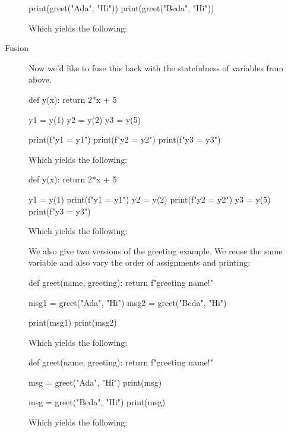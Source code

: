 \begin{description}
\begin{minipage}[t]{0.45\columnwidth}
\begin{pyblock}[funcG2]
print(greet("Ada", "Hi"))
print(greet("Beda", "Hi"))
      \end{pyblock}

      Which yields the following:
      \printpythontex[verbatim]
    \end{minipage}

  \item[Fusion] Now we'd like to fuse this back with the statefulness of 
    variables from above.

    \begin{minipage}[t]{0.45\columnwidth}
      \begin{pyblock}[funcG1]
def y(x):
  return 2*x + 5

y1 = y(1)
y2 = y(2)
y3 = y(5)

print(f"y1 = {y1}")
print(f"y2 = {y2}")
print(f"y3 = {y3}")
      \end{pyblock}

      Which yields the following:
      \printpythontex[verbatim]
    \end{minipage}
    \hfill
    \begin{minipage}[t]{0.45\columnwidth}
      \begin{pyblock}[funcG1]
def y(x):
  return 2*x + 5


y1 = y(1)
print(f"y1 = {y1}")
y2 = y(2)
print(f"y2 = {y2}")
y3 = y(5)
print(f"y3 = {y3}")
      \end{pyblock}

      Which yields the following:
      \printpythontex[verbatim]
    \end{minipage}

    We also give two versions of the greeting example.
    We reuse the same variable and also vary the order of assignments and 
    printing:


    \begin{minipage}[t]{0.45\columnwidth}
      \begin{pyblock}[funcG2]
def greet(name, greeting):
  return f"{greeting} {name}!"

msg1 = greet("Ada", "Hi")
msg2 = greet("Beda", "Hi")

print(msg1)
print(msg2)
      \end{pyblock}

      Which yields the following:
      \printpythontex[verbatim]
    \end{minipage}
    \hfill
    \begin{minipage}[t]{0.45\columnwidth}
      \begin{pyblock}[funcG2]
def greet(name, greeting):
  return f"{greeting} {name}!"

msg = greet("Ada", "Hi")
print(msg)

msg = greet("Beda", "Hi")
print(msg)
      \end{pyblock}

      Which yields the following:
      \printpythontex[verbatim]
    \end{minipage}

\end{description}

